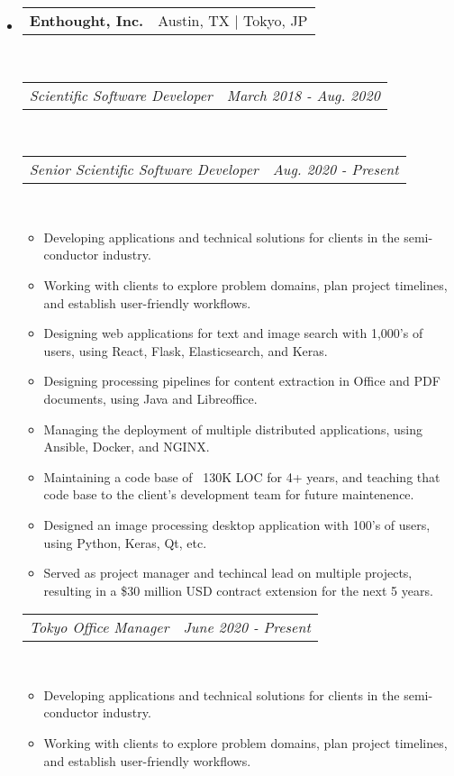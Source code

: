 \documentclass{article}
\makeatletter
\newcommand{\subheading}[2]{
	\begin{tabular*}{\textwidth-\leftmargin}{l@{\extracolsep{\fill}}r}
		\textbf{#1} & #2 \\
	\end{tabular*} \\
}
\newcommand{\itemheading}[2]{
	\vspace{1pt}
	\begin{tabular*}{\textwidth-\leftmargin}{l@{\extracolsep{\fill}}r}
		\textit{#1} & \textit{#2} \\
	\end{tabular*} \\
	\vspace{-2pt}
}
\makeatother
\begin{document}
\begin{itemize}
\item
	\subheading{Enthought, Inc.}{Austin, TX | Tokyo, JP}
	\itemheading{Scientific Software Developer}{March 2018 - Aug. 2020}
	\vspace{2pt}
	\itemheading{Senior Scientific Software Developer}{Aug. 2020 - Present}
	\begin{itemize}
	    \item Developing applications and technical solutions for clients in the semi-conductor industry.
	    \item Working with clients to explore problem domains, plan project timelines, and establish user-friendly workflows.
		\item Designing web applications for text and image search with 1,000's of users, using React, Flask, Elasticsearch, and Keras.
		\item Designing processing pipelines for content extraction in Office and PDF documents, using Java and Libreoffice.
	    \item Managing the deployment of multiple distributed applications, using Ansible, Docker, and NGINX.
		\item Maintaining a code base of ~130K LOC for 4+ years, and teaching that code base to the client's development team for future maintenence.
	    \item Designed an image processing desktop application with 100's of users, using Python, Keras, Qt, etc.
		\item Served as project manager and techincal lead on multiple projects, resulting in a \$30 million USD contract extension for the next 5 years.
	\end{itemize}
	\itemheading{Tokyo Office Manager}{June 2020 - Present}
	\begin{itemize}
	    \item Developing applications and technical solutions for clients in the semi-conductor industry.
	    \item Working with clients to explore problem domains, plan project timelines, and establish user-friendly workflows.
	\end{itemize}


\end{itemize}
\end{document}

